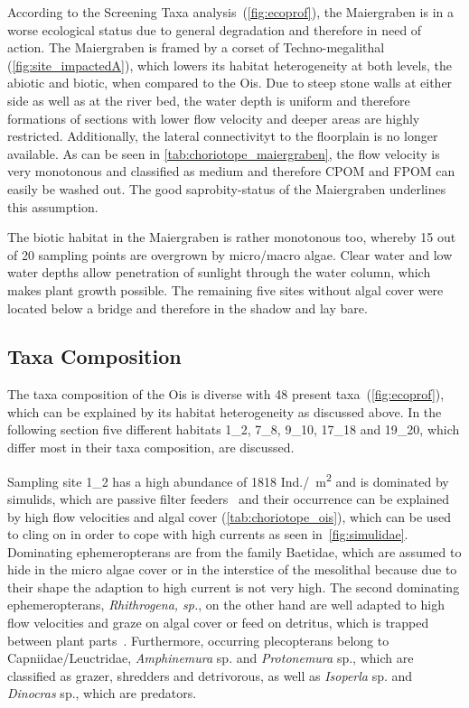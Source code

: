 According to the Screening Taxa analysis~(\cref{fig:ecoprof}), the Maiergraben is in a worse ecological status due to general degradation and therefore in need of action. The Maiergraben is framed by a corset of Techno-megalithal (\cref{fig:site_impactedA}), which lowers its habitat heterogeneity at both levels, the abiotic and biotic, when compared to the Ois. Due to steep stone walls at either side as well as at the river bed, the water depth is uniform and therefore formations of sections with lower flow velocity and deeper areas are highly restricted. Additionally, the lateral connectivityt to the floorplain is no longer available. As can be seen in \cref{tab:choriotope_maiergraben}, the flow velocity is very monotonous and classified as medium and therefore CPOM and FPOM can easily be washed out. The good saprobity-status of the Maiergraben underlines this assumption.

The biotic habitat in the Maiergraben is rather monotonous too, whereby 15 out of 20 sampling points are overgrown by micro/macro algae. Clear water and low water depths allow penetration of sunlight through the water column, which makes plant growth possible. The remaining five sites without algal cover were located below a bridge and therefore in the shadow and lay bare.


\subsection{Taxa Composition}\label{sec:disc_taxa_composition}      %


The taxa composition of the Ois is diverse with 48 present taxa~(\cref{fig:ecoprof}), which can be explained by its habitat heterogeneity as discussed above. In the following section five different habitats 1\_2, 7\_8, 9\_10, 17\_18 and 19\_20, which differ most in their taxa composition, are discussed.

Sampling site 1\_2 has a high abundance of 1818 Ind./\SI{}{\square\meter} and is dominated by simulids, which are passive filter feeders~ and their occurrence can be explained by high flow velocities and algal cover (\cref{tab:choriotope_ois}), which can be used to cling on in order to cope with high currents as seen in~\cref{fig:simulidae}. Dominating ephemeropterans are from the family Baetidae, which are assumed to hide in the micro algae cover or in the interstice of the mesolithal because due to their shape the adaption to high current is not very high. The second dominating ephemeropterans, \emph{Rhithrogena, sp.}, on the other hand are well adapted to high flow velocities and graze on algal cover or feed on detritus, which is trapped between plant parts~. Furthermore, occurring plecopterans belong to Capniidae/Leuctridae, \emph{Amphinemura} sp. and \emph{Protonemura} sp., which are classified as grazer, shredders and detrivorous, as well as \emph{Isoperla} sp. and \emph{Dinocras} sp., which are predators.

